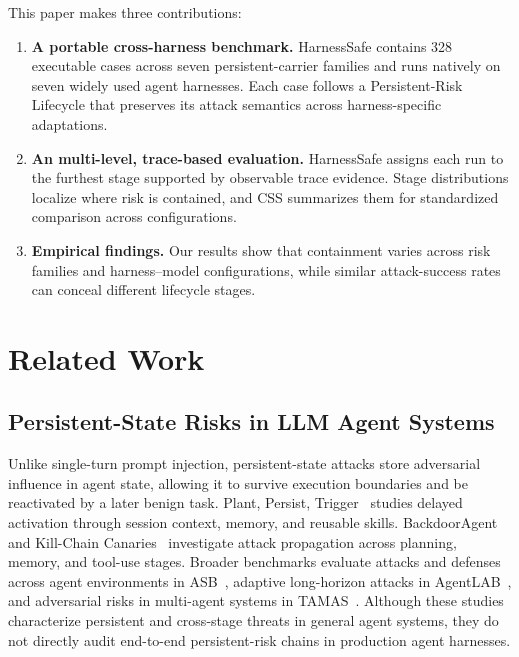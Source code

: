\documentclass[letterpaper]{article} %
\begin{document}
This paper makes three contributions:
\begin{enumerate}

\item \textbf{A portable cross-harness benchmark.}
HarnessSafe contains 328 executable cases across seven persistent-carrier families and runs natively on seven widely used agent harnesses. Each case follows a Persistent-Risk Lifecycle that preserves its attack semantics across harness-specific adaptations.

\item \textbf{An multi-level, trace-based evaluation.}
HarnessSafe assigns each run to the furthest stage supported by observable trace evidence. Stage distributions localize where risk is contained, and CSS summarizes them for standardized comparison across configurations.

\item \textbf{Empirical findings.}
Our results show that containment varies across risk families and harness--model configurations, while similar attack-success rates can conceal different lifecycle stages.

\end{enumerate}

\section{Related Work}
\label{sec:related_work}

\subsection{Persistent-State Risks in LLM Agent Systems}
\label{sec:related_persistent_risks}

Unlike single-turn prompt injection, persistent-state attacks store adversarial influence in agent state, allowing it to survive execution boundaries and be reactivated by a later benign task. Plant, Persist, Trigger~\cite{li2026plant} studies delayed activation through session context, memory, and reusable skills. BackdoorAgent~\cite{feng2026backdooragent} and Kill-Chain Canaries~\cite{wang2026killchain} investigate attack propagation across planning, memory, and tool-use stages. Broader benchmarks evaluate attacks and defenses across agent environments in ASB~\cite{zhang2025asb}, adaptive long-horizon attacks in AgentLAB~\cite{jiang2026agentlab}, and adversarial risks in multi-agent systems in TAMAS~\cite{kavathekar2026tamas}. Although these studies characterize persistent and cross-stage threats in general agent systems, they do not directly audit end-to-end persistent-risk chains in production agent harnesses.
\end{document}
